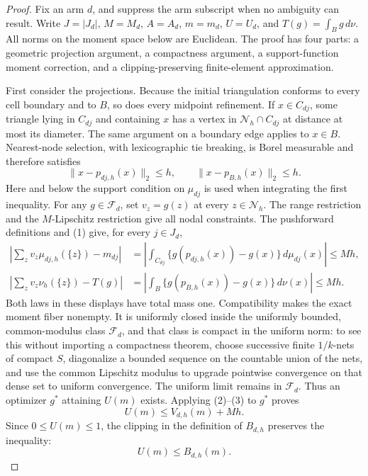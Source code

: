 \documentclass{article}
\begin{document}
\begin{proof}
Fix an arm \(d\), and suppress the arm subscript when no ambiguity can
result.  Write \(J=|J_d|\), \(M=M_d\), \(A=A_d\), \(m=m_d\),
\(U=U_d\), and \(T(g)=\int_B g\,d\nu\).  All norms on the moment
space below are Euclidean.  The proof has four parts: a geometric projection
argument, a compactness argument, a support-function moment correction, and a
clipping-preserving finite-element approximation.

First consider the projections.  Because the initial triangulation conforms to
every cell boundary and to \(B\), so does every midpoint refinement.  If
\(x\in C_{dj}\), some triangle lying in \(C_{dj}\) and containing \(x\) has a
vertex in \(\mathcal N_h\cap C_{dj}\) at distance at most its diameter.  The
same argument on a boundary edge applies to \(x\in B\).  Nearest-node
selection, with lexicographic tie breaking, is Borel measurable and therefore
satisfies
\[
 \|x-p_{dj,h}(x)\|_2\le h,
 \qquad
 \|x-p_{B,h}(x)\|_2\le h.                                      \tag{1}
\]
Here and below the support condition on \(\mu_{dj}\) is used when integrating
the first inequality.  For any \(g\in\mathcal F_d\), set
\(v_z=g(z)\) at every \(z\in\mathcal N_h\).  The range restriction and the
\(M\)-Lipschitz restriction give all nodal constraints.  The pushforward
definitions and (1) give, for every \(j\in J_d\),
\begin{align}
 \left|\sum_z v_z\mu_{dj,h}(\{z\})-m_{dj}\right|
 &=\left|\int_{C_{dj}}\{g(p_{dj,h}(x))-g(x)\}\,d\mu_{dj}(x)\right|
 \le Mh,                                                       \tag{2}\\
 \left|\sum_z v_z\nu_h(\{z\})-T(g)\right|
 &=\left|\int_B\{g(p_{B,h}(x))-g(x)\}\,d\nu(x)\right|
 \le Mh.                                                       \tag{3}
\end{align}
Both laws in these displays have total mass one.  Compatibility makes the
exact moment fiber nonempty.  It is uniformly closed inside the uniformly
bounded, common-modulus class \(\mathcal F_d\), and that class is compact in
the uniform norm: to see this without importing a compactness theorem, choose
successive finite \(1/k\)-nets of compact \(S\), diagonalize a bounded sequence
on the countable union of the nets, and use the common Lipschitz modulus to
upgrade pointwise convergence on that dense set to uniform convergence.  The
uniform limit remains in \(\mathcal F_d\).  Thus an optimizer \(g^*\) attaining
\(U(m)\) exists.  Applying (2)--(3) to \(g^*\) proves
\[
 U(m)\le V_{d,h}(m)+Mh.
\]
Since \(0\le U(m)\le1\), the clipping in the definition of \(B_{d,h}\)
preserves the inequality:
\[
 U(m)\le B_{d,h}(m).                                         \tag{4}
\]


\end{proof}
\end{document}
